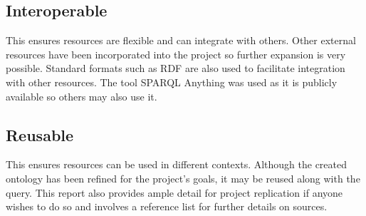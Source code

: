 \subsection{Interoperable}
\hspace{0.5cm} This ensures resources are flexible and can integrate with others. Other external resources have been incorporated into the project so further expansion is very possible. Standard formats such as RDF are also used to facilitate integration with other resources. The tool SPARQL Anything was used as it is publicly available so others may also use it. 

\subsection{Reusable}
\hspace{0.5cm} This ensures resources can be used in different contexts. Although the created ontology has been refined for the project's goals, it may be reused along with the query. This report also provides ample detail for project replication if anyone wishes to do so and involves a reference list for further details on sources. 
